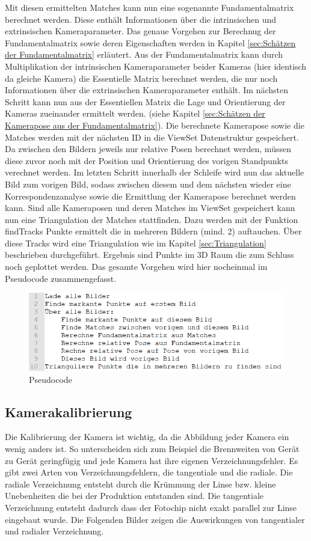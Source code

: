 Mit diesen ermittelten Matches kann nun eine sogenannte Fundamentalmatrix berechnet werden. Diese enthält Informationen über die intrinsischen und extrinsischen Kameraparameter. Das genaue Vorgehen zur Berechnug der Fundamentalmatrix sowie deren Eigenschaften werden in Kapitel \ref{sec:Schätzen der Fundamentalmatrix} erläutert. 
Aus der Fundamentalmatrix kann durch Multiplikation der intrinsischen Kameraparameter beider Kameras (hier identisch da gleiche Kamera) die Essentielle Matrix berechnet werden, die nur noch Informationen über die extrinsischen Kameraparameter enthält. Im nächsten Schritt kann nun aus der Essentiellen Matrix die Lage und Orientierung der Kameras zueinander ermittelt werden. (siehe Kapitel \ref{sec:Schätzen der Kamerapose aus der Fundamentalmatrix}).
Die berechnete Kamerapose sowie die Matches werden mit der nächsten ID in die ViewSet  Datenstruktur gespeichert. Da zwischen den Bildern jeweils nur relative Posen berechnet werden, müssen diese zuvor noch mit der Position und Orientierung des vorigen Standpunkts verechnet werden. 
Im letzten Schritt innerhalb der Schleife wird nun das aktuelle Bild zum vorigen Bild, sodass zwischen diesem und dem nächsten wieder eine Korrespondenzanalyse sowie die Ermittlung der Kamerapose berechnet werden kann.
Sind alle Kameraposen und deren Matches im ViewSet gespeichert kann nun eine Triangulation der Matches stattfinden. Dazu werden mit der Funktion findTracks Punkte ermittelt die in mehreren Bildern (mind. 2) auftauchen. Über diese Tracks wird eine Triangulation wie im Kapitel \ref{sec:Triangulation} beschrieben durchgeführt. Ergebnis sind Punkte im 3D Raum die zum Schluss noch geplottet werden.
Das gesamte Vorgehen wird hier nocheinmal im Pseudocode zusammengefasst.
\begin{figure}[ht]
    \centering
    \includegraphics[scale=0.75]{Figures/Pseudocode.PNG}
    \caption{Pseudocode}
\end{figure}

\subsection{Kamerakalibrierung}
\label{sec:Kamerakalibrierung}
Die Kalibrierung der Kamera ist wichtig, da die Abbildung jeder Kamera ein wenig anders ist. So unterscheiden sich zum Beispiel die Brennweiten von Gerät zu Gerät geringfügig und jede Kamera hat ihre eigenen Verzeichnungsfehler.
Es gibt zwei Arten von Verzeichnungsfehlern, die tangentiale und die radiale. Die radiale Verzeichnung entsteht durch die Krümmung der Linse bzw. kleine Unebenheiten die bei der Produktion entstanden sind. Die tangentiale Verzeichnung entsteht dadurch dass der Fotochip nicht exakt parallel zur Linse eingebaut wurde. Die Folgenden Bilder zeigen die Auswirkungen von tangentialer und radialer Verzeichnung.\cite{Verlag}


